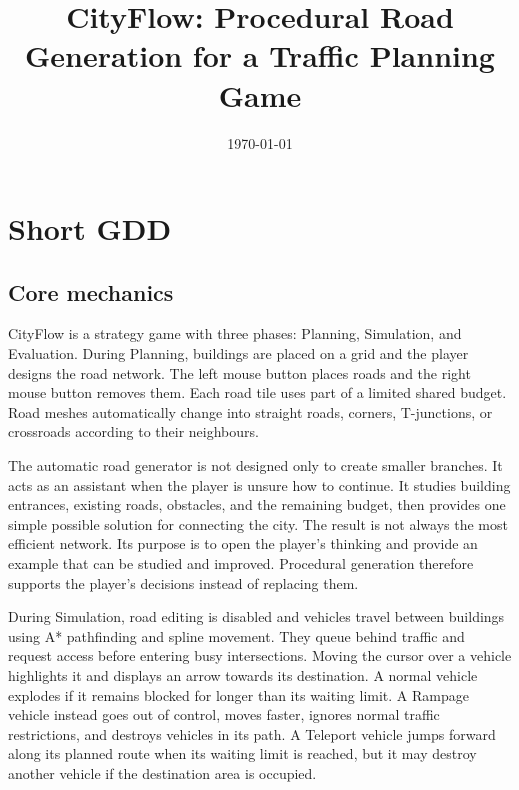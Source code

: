\documentclass[10pt, a4paper, twocolumn]{article}
\title{CityFlow: Procedural Road Generation for a Traffic Planning Game}
\author{
    \authorstyle{[YOUR NAME]}
    \newline
    \authorstyle{[YOUR STUDENT ID]}
    \newline\newline
    \institution{}
}
\date{\today}
\begin{document}
\maketitle
\thispagestyle{firstpage}


\section{Short GDD}

\subsection{Core mechanics}

CityFlow is a strategy game with three phases: Planning, Simulation, and Evaluation. During Planning, buildings are placed on a grid and the player designs the road network. The left mouse button places roads and the right mouse button removes them. Each road tile uses part of a limited shared budget. Road meshes automatically change into straight roads, corners, T-junctions, or crossroads according to their neighbours.

The automatic road generator is not designed only to create smaller branches. It acts as an assistant when the player is unsure how to continue. It studies building entrances, existing roads, obstacles, and the remaining budget, then provides one simple possible solution for connecting the city. The result is not always the most efficient network. Its purpose is to open the player's thinking and provide an example that can be studied and improved. Procedural generation therefore supports the player's decisions instead of replacing them.

During Simulation, road editing is disabled and vehicles travel between buildings using A* pathfinding and spline movement. They queue behind traffic and request access before entering busy intersections. Moving the cursor over a vehicle highlights it and displays an arrow towards its destination. A normal vehicle explodes if it remains blocked for longer than its waiting limit. A Rampage vehicle instead goes out of control, moves faster, ignores normal traffic restrictions, and destroys vehicles in its path. A Teleport vehicle jumps forward along its planned route when its waiting limit is reached, but it may destroy another vehicle if the destination area is occupied.
\end{document}
